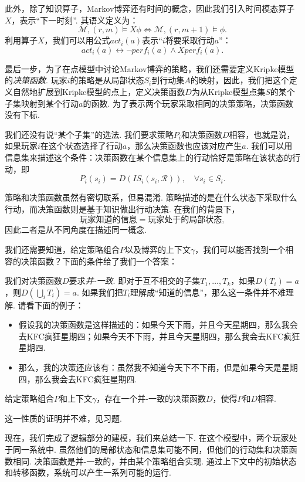 此外，除了知识算子，Markov博弈还有时间的概念，因此我们引入时间模态算子$X$，表示“下一时刻”. 其语义定义为：
\[
\mathcal{M}, (r, m) \vDash X\phi \iff \mathcal{M}, (r, m+1) \vDash \phi.
\]
利用算子$X$，我们可以用公式$act_i(a)$表示“$i$将要采取行动$a$”：
\[act_i(a) \leftrightarrow \neg perf_i(a) \wedge X perf_i(a).\]

最后一步，为了在点模型中讨论Markov博弈的策略，我们还需要定义Kripke模型的\emph{决策函数}. 玩家$i$的策略是从局部状态$S_i$到行动集$A$的映射，因此，我们把这个定义自然地扩展到Kripke模型的点上，定义决策函数$D$为从Kripke模型点集$S$的某个子集映射到某个行动$a$的函数. 为了表示两个玩家采取相同的决策策略，决策函数没有下标. 

我们还没有说“某个子集”的选法. 我们要求策略$P_i$和决策函数$D$相容，也就是说，如果玩家$i$在这个状态选择了行动$a$，那么决策函数也应该对应产生$a$. 我们可以用信息集来描述这个条件：决策函数在某个信息集上的行动恰好是策略在该状态的行动，即
\[
P_i(s_i) = D(IS_i(s_i, \mathcal{R})), \quad \forall s_i \in S_i.
\]

策略和决策函数虽然有密切联系，但易混淆. 策略描述的是在什么状态下采取什么行动，而决策函数则是基于知识做出行动决策. 在我们的背景下，
    \[\text{玩家知道的信息}=\text{玩家处于的局部状态},\]
因此二者是从不同角度在描述同一概念. 

我们还需要知道，给定策略组合$P$以及博弈的上下文$\gamma$，我们可以能否找到一个相容的决策函数？下面的条件给了我们一个答案：

我们对决策函数$D$要求\emph{并-一致}. 即对于互不相交的子集$T_1, \dots, T_k$，如果$D(T_i) = a$，则$D(\bigcup_i T_i) = a$. 如果我们把$T_i$理解成“知道的信息”，那么这一条件并不难理解. 请看下面的例子：
\begin{itemize}
    \item 假设我的决策函数是这样描述的：如果今天下雨，并且今天星期四，那么我会去KFC疯狂星期四；如果今天不下雨，并且今天星期四，那么我会去KFC疯狂星期四.
    \item 那么，我的决策还应该有：虽然我不知道今天下不下雨，但是如果今天是星期四，那么我会去KFC疯狂星期四.
\end{itemize}

\begin{proposition}\label{prop:consistent-decision}
    给定策略组合$P$和上下文$\gamma$，存在一个并-一致的决策函数$D$，使得$P$和$D$相容. 
\end{proposition}

这一性质的证明并不难，见习题. 

现在，我们完成了逻辑部分的建模，我们来总结一下. 在这个模型中，两个玩家处于同一系统中. 虽然他们的局部状态和信息集可能不同，但他们的行动集和决策函数相同. 决策函数是并-一致的，并由某个策略组合实现. 通过上下文中的初始状态和转移函数，系统可以产生一系列可能的运行. 

